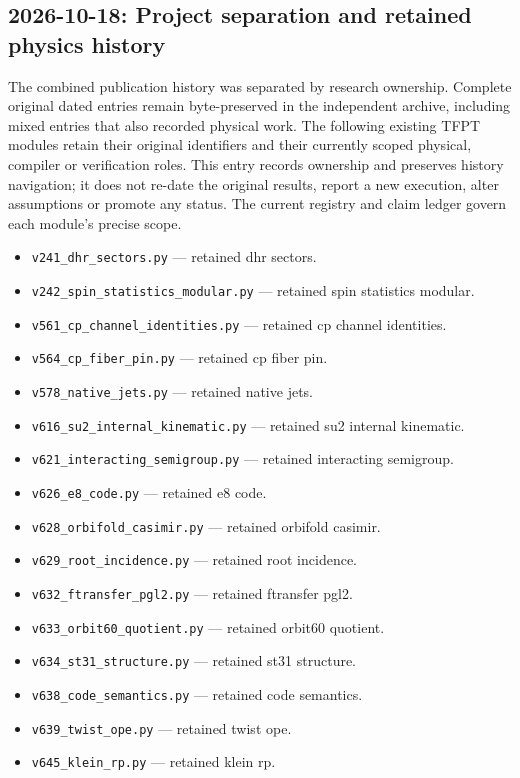 \subsection*{2026-10-18: Project separation and retained physics history}
The combined publication history was separated by research ownership.  Complete
original dated entries remain byte-preserved in the independent archive, including
mixed entries that also recorded physical work.  The following existing TFPT
modules retain their original identifiers and their currently scoped physical,
compiler or verification roles.  This entry records ownership and preserves
history navigation; it does not re-date the original results, report a new
execution, alter assumptions or promote any status.  The current registry and
claim ledger govern each module's precise scope.
\begin{itemize}[leftmargin=2em,itemsep=1pt]
\item \texttt{v241\_dhr\_sectors.py} --- retained dhr sectors.
\item \texttt{v242\_spin\_statistics\_modular.py} --- retained spin statistics modular.
\item \texttt{v561\_cp\_channel\_identities.py} --- retained cp channel identities.
\item \texttt{v564\_cp\_fiber\_pin.py} --- retained cp fiber pin.
\item \texttt{v578\_native\_jets.py} --- retained native jets.
\item \texttt{v616\_su2\_internal\_kinematic.py} --- retained su2 internal kinematic.
\item \texttt{v621\_interacting\_semigroup.py} --- retained interacting semigroup.
\item \texttt{v626\_e8\_code.py} --- retained e8 code.
\item \texttt{v628\_orbifold\_casimir.py} --- retained orbifold casimir.
\item \texttt{v629\_root\_incidence.py} --- retained root incidence.
\item \texttt{v632\_ftransfer\_pgl2.py} --- retained ftransfer pgl2.
\item \texttt{v633\_orbit60\_quotient.py} --- retained orbit60 quotient.
\item \texttt{v634\_st31\_structure.py} --- retained st31 structure.
\item \texttt{v638\_code\_semantics.py} --- retained code semantics.
\item \texttt{v639\_twist\_ope.py} --- retained twist ope.
\item \texttt{v645\_klein\_rp.py} --- retained klein rp.

\end{itemize}
